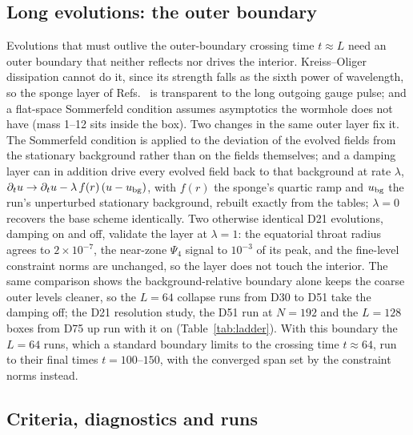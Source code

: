\documentclass[twocolumn,floatfix,aps,prd,superscriptaddress,nofootinbib]{revtex4-2}
\begin{document}
\subsection{Long evolutions: the outer boundary}
\label{sec:setup:boundary}

Evolutions that must outlive the outer-boundary crossing time $t\approx L$ need an outer boundary that neither reflects nor drives the interior. Kreiss--Oliger dissipation cannot do it, since its strength falls as the sixth power of wavelength, so the sponge layer of Refs.~\cite{shirokov2026,shirokov2026c} is transparent to the long outgoing gauge pulse; and a flat-space Sommerfeld condition assumes asymptotics the wormhole does not have (mass 1--12 sits inside the box). Two changes in the same outer layer fix it. The Sommerfeld condition is applied to the deviation of the evolved fields from the stationary background rather than on the fields themselves; and a damping layer can in addition drive every evolved field back to that background at rate $\lambda$, $\partial_t u \to \partial_t u - \lambda\,f(r)\,(u-u_{\rm bg})$, with $f(r)$ the sponge's quartic ramp and $u_{\rm bg}$ the run's unperturbed stationary background, rebuilt exactly from the tables; $\lambda=0$ recovers the base scheme identically. Two otherwise identical D21 evolutions, damping on and off, validate the layer at $\lambda=1$: the equatorial throat radius agrees to $2\times10^{-7}$, the near-zone $\Psi_4$ signal to $10^{-3}$ of its peak, and the fine-level constraint norms are unchanged, so the layer does not touch the interior. The same comparison shows the background-relative boundary alone keeps the coarse outer levels cleaner, so the $L=64$ collapse runs from D30 to D51 take the damping off; the D21 resolution study, the D51 run at $N=192$ and the $L=128$ boxes from D75 up run with it on (Table~\ref{tab:ladder}). With this boundary the $L=64$ runs, which a standard boundary limits to the crossing time $t\approx64$, run to their final times $t=100$--$150$, with the converged span set by the constraint norms instead.

\subsection{Criteria, diagnostics and runs}
\label{sec:setup:runs}
\end{document}
